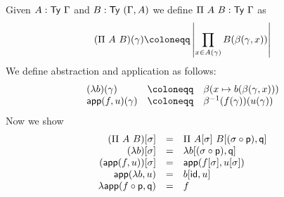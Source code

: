 Given \(A : \mathsf{Ty}\ \Gamma\) and \(B : \mathsf{Ty}\ (\Gamma, A)\) we define
\(\Pi\ A\ B : \mathsf{Ty}\ \Gamma\) as
\[
  (\Pi\ A\ B)(\gamma) \coloneqq \card{\prod_{x \in A(\gamma)} B(\beta(\gamma,x))}
\]
We define abstraction and application as follows:
\[
  \begin{array}{lcl}
    (\lambda b)(\gamma) &\coloneqq& \beta(x \mapsto b(\beta(\gamma,x))) \\
    \capp(f,u)(\gamma) &\coloneqq& \beta^{-1}(f(\gamma))(u(\gamma))
  \end{array}
\]
Now we show
\[
  \begin{array}{rcl}
    (\Pi\ A\ B)[\sigma] &=& \Pi\ A[\sigma]\ B[(\sigma \circ \mathsf{p}), \mathsf{q}] \\
    (\lambda b)[\sigma] &=& \lambda b[(\sigma \circ \mathsf{p}), \mathsf{q}] \\
    (\mathsf{app}(f,u))[\sigma] &=& \mathsf{app}(f[\sigma],u[\sigma]) \\
    \mathsf{app}(\lambda b, u) &=& b[\mathsf{id}, u] \\
    \lambda \mathsf{app}(f \circ \mathsf{p}, \mathsf{q}) &=& f
  \end{array}
\]

